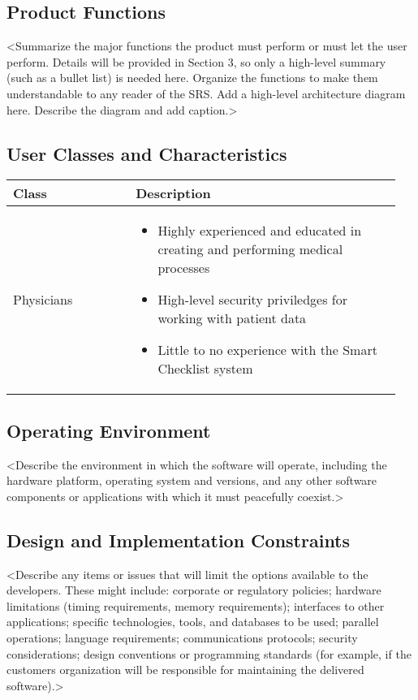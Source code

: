 \documentclass{article}
\begin{document}
\subsection{Product Functions}
<Summarize the major functions the product must perform or must let the user perform. Details will be provided in Section 3, so only a high-level summary (such as a bullet list) is needed here. Organize the functions to make them understandable to any reader of the SRS. Add a high-level architecture diagram here. Describe the diagram and add caption.>

\subsection{User Classes and Characteristics}

\begin{tabular}{| p{0.3\linewidth} | p{0.65\linewidth} |}
  \hline
  \textbf{Class} & \textbf{Description} \\
  \hline
  \hline
  Physicians & \begin{itemize}
    \item Highly experienced and educated in creating and performing medical processes
    \item High-level security priviledges for working with patient data
    \item Little to no experience with the Smart Checklist system
  \end{itemize} \\
  \hline
\end{tabular}


\subsection{Operating Environment}
<Describe the environment in which the software will operate, including the hardware platform, operating system and versions, and any other software components or applications with which it must peacefully coexist.>

\subsection{Design and Implementation Constraints}
<Describe any items or issues that will limit the options available to the developers. These might include: corporate or regulatory policies; hardware limitations (timing requirements, memory requirements); interfaces to other applications; specific technologies, tools, and databases to be used; parallel operations; language requirements; communications protocols; security considerations; design conventions or programming standards (for example, if the customers organization will be responsible for maintaining the delivered software).>
\end{document}
